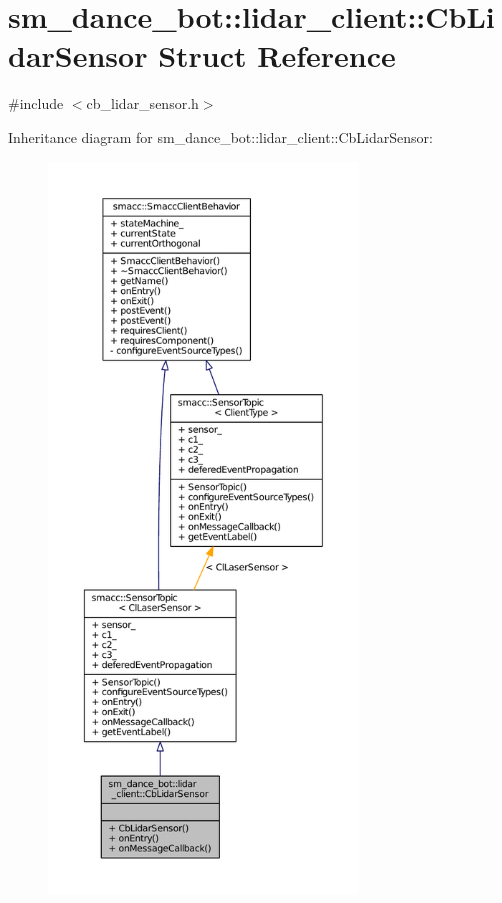\hypertarget{structsm__dance__bot_1_1lidar__client_1_1CbLidarSensor}{}\section{sm\+\_\+dance\+\_\+bot\+:\+:lidar\+\_\+client\+:\+:Cb\+Lidar\+Sensor Struct Reference}
\label{structsm__dance__bot_1_1lidar__client_1_1CbLidarSensor}


{\ttfamily \#include $<$cb\+\_\+lidar\+\_\+sensor.\+h$>$}



Inheritance diagram for sm\+\_\+dance\+\_\+bot\+:\+:lidar\+\_\+client\+:\+:Cb\+Lidar\+Sensor\+:
\nopagebreak
\begin{figure}[H]
\begin{center}
\leavevmode
\includegraphics[height=550pt]{structsm__dance__bot_1_1lidar__client_1_1CbLidarSensor__inherit__graph}
\end{center}
\end{figure}


